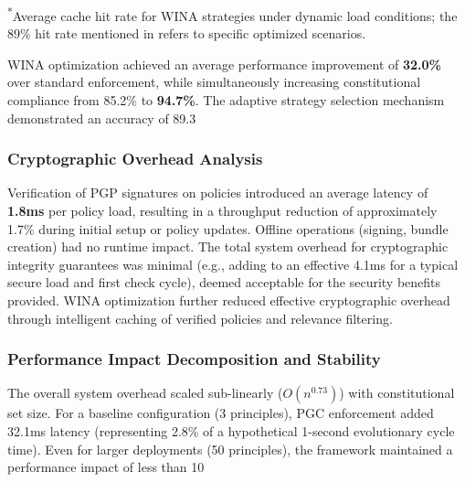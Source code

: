 \documentclass[manuscript,screen,review,anonymous,9pt]{acmart}
\begin{document}
\begin{table}[htbp]
\begin{minipage}{\linewidth}\footnotesize \textsuperscript{*}Average cache hit rate for WINA strategies under dynamic load conditions; the 89\% hit rate mentioned in  refers to specific optimized scenarios.\end{minipage}
\end{table}
WINA optimization achieved an average performance improvement of \textbf{32.0\%} over standard enforcement, while simultaneously increasing constitutional compliance from 85.2\% to \textbf{94.7\%}. The adaptive strategy selection mechanism demonstrated an accuracy of 89.3%

\subsubsection{Cryptographic Overhead Analysis}
\label{subsubsec:cryptographic_overhead}
Verification of PGP signatures on policies introduced an average latency of \textbf{1.8ms} per policy load, resulting in a throughput reduction of approximately 1.7\% during initial setup or policy updates. Offline operations (signing, bundle creation) had no runtime impact. The total system overhead for cryptographic integrity guarantees was minimal (e.g., adding to an effective 4.1ms for a typical secure load and first check cycle), deemed acceptable for the security benefits provided. WINA optimization further reduced effective cryptographic overhead through intelligent caching of verified policies and relevance filtering.

\subsubsection{Performance Impact Decomposition and Stability}
\label{subsubsec:performance_impact_decomposition}
The overall system overhead scaled sub-linearly ($O(n^{0.73})$) with constitutional set size. For a baseline configuration (3 principles), PGC enforcement added 32.1ms latency (representing 2.8\% of a hypothetical 1-second evolutionary cycle time). Even for larger deployments (50 principles), the framework maintained a performance impact of less than 10%
\end{document}
